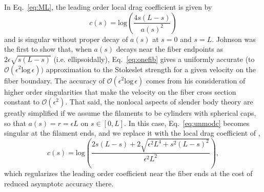 In Eq.\ \eqref{eq:ML}, the leading order local drag coefficient is given by \cite{gotz2001interactions}
\begin{equation}
\label{eq:unmodc}
c(s) = \text{log}\left(\frac{4s(L-s)}{a(s)^2}\right)
\end{equation}
and is singular without proper decay of $a(s)$ at $s=0$ and $s=L$. Johnson \cite{johnson} was the first to show that, when $a(s)$ decays near the fiber endpoints as $2\epsilon\sqrt{s(L-s)}$ (i.e. ellipsoidally), Eq.\ \eqref{eq:onefib} gives a uniformly accurate (to $\mathcal{O}(\epsilon^2 \text{log}\, \epsilon))$ approximation to the Stokeslet strength for a given velocity on the fiber boundary. The accuracy of $\mathcal{O}(\epsilon^2 \text{log}\, \epsilon)$ comes from his consideration of higher order singularities that make the velocity on the fiber cross section constant to $\mathcal{O}(\epsilon^2)$. That said, the nonlocal aspects of slender body theory are greatly simplified if we assume the filaments to be cylinders with spherical caps, so that $a(s) = r = \epsilon L$ on $s \in [0,L]$. In this case, Eq.\ \eqref{eq:unmodc} becomes singular at the filament ends, and we replace it with the local drag coefficient of \cite{morifree}, 
\begin{equation}
\label{eq:creg}
c(s) = \text{log}\left(\frac{2s(L-s)+2\sqrt{\epsilon^2 L^4 + s^2(L-s)^2}}{\epsilon^2 L^2}\right),
\end{equation}
which regularizes the leading order coefficient near the fiber ends at the cost of reduced asymptotc accuracy there. %

